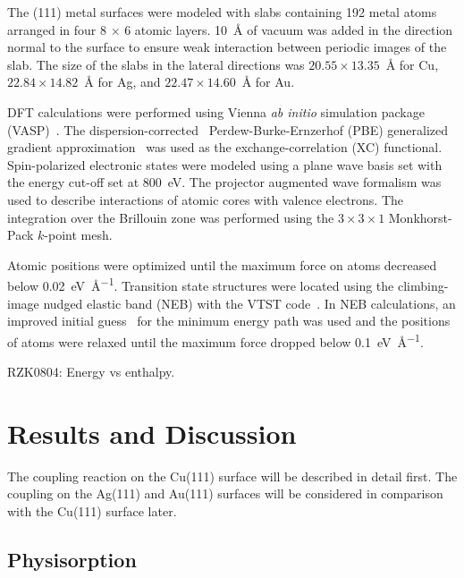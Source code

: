 \documentclass[journal=jacsat,manuscript=article]{achemso}
\newcommand{\lock}{\color{red}}
\newcommand{\lock}{\color{black}}
\newcommand{\comm}{\color{ForestGreen}} %
\begin{document}
{\lock

The (111) metal surfaces were modeled with slabs containing 192 metal atoms arranged in four 8 $\times$ 6 atomic layers. \SI{10}{\angstrom} of vacuum was added in the direction normal to the surface to ensure weak interaction between periodic images of the slab. The size of the slabs in the lateral directions was $20.55 \times 13.35$~\si{\angstrom} for Cu, $22.84 \times 14.82$~\si{\angstrom} for Ag, and $22.47 \times 14.60$~\si{\angstrom} for Au.

DFT calculations were performed using Vienna \emph{ab initio} simulation package (VASP)~\cite{ullmann_131, ullmann_132, ullmann_133, ullmann_134}. The dispersion-corrected~\cite{ullmann_136, ullmann_137} Perdew-Burke-Ernzerhof (PBE) generalized gradient approximation~\cite{ullmann_139} was used as the exchange-correlation (XC) functional. 
Spin-polarized electronic states were modeled using a plane wave basis set with the energy cut-off set at \SI{800}{\electronvolt}.
The projector augmented wave formalism was used to describe interactions of atomic cores with valence electrons. The integration over the Brillouin zone was performed using the $3\times 3 \times1$ Monkhorst-Pack $k$-point mesh. 

Atomic positions were optimized until the maximum force on atoms decreased below \SI{0.02}{\electronvolt\per\angstrom}. 
Transition state structures were located using the climbing-image nudged elastic band (NEB) with the VTST code~\cite{ullmann_59}. 
In NEB calculations, an improved initial guess~\cite{ullmann_60, ullmann_99} for the minimum energy path was used and the positions of atoms were relaxed until the maximum force dropped below \SI{0.1}{\electronvolt\per\angstrom}.

{\comm RZK0804: Energy vs enthalpy.}

}

\section{Results and Discussion}

The coupling reaction on the Cu(111) surface will be described in detail first. The coupling on the Ag(111) and Au(111) surfaces will be considered in comparison with the Cu(111) surface later.


\ifdefined\INTERNAL
\subsection{Physisorption}
\fi
\end{document}
